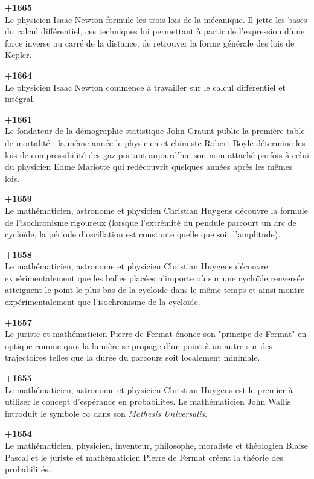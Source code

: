 \textbf{+1665}\\
Le physicien Isaac Newton formule les trois lois de la mécanique. Il jette les bases du calcul différentiel, ces techniques lui permettant à partir de l'expression d'une force inverse au carré de la distance, de retrouver la forme générale des lois de Kepler.

\textbf{+1664}\\
Le physicien Isaac Newton commence à travailler sur le calcul différentiel et intégral.

\textbf{+1661}\\
Le fondateur de la démographie statistique John Graunt publie la première table de mortalité ; la même année le physicien et chimiste Robert Boyle détermine les lois de compressibilité des gaz portant aujourd'hui son nom attaché parfois à celui du physicien Edme Mariotte  qui redécouvrit quelques années après les mêmes lois.

\textbf{+1659}\\
Le mathématicien, astronome et physicien Christian Huygens découvre la formule de l'isochronisme rigoureux (lorsque l'extrémité du pendule parcourt un arc de cycloïde, la période d'oscillation est constante quelle que soit l'amplitude).

\textbf{+1658}\\
Le mathématicien, astronome et physicien Christian Huygens découvre expérimentalement que les balles placées n'importe où sur une cycloïde renversée atteignent le point le plus bas de la cycloïde dans le même temps et ainsi montre expérimentalement que l'isochronisme de la cycloïde.

\textbf{+1657}\\
Le juriste et mathématicien Pierre de Fermat énonce son "principe de Fermat" en optique comme quoi la lumière se propage d'un point à un autre sur des trajectoires telles que la durée du parcours soit localement minimale.

\textbf{+1655}\\
Le mathématicien, astronome et physicien Christian Huygens est le premier à utiliser le concept d'espérance en probabilités. Le mathématicien John Wallis introduit le symbole $\infty$ dans son \textit{Mathesis Universalis}.

\textbf{+1654}\\
Le mathématicien, physicien, inventeur, philosophe, moraliste et théologien Blaise Pascal et le juriste et mathématicien Pierre de Fermat créent la théorie des probabilités.

